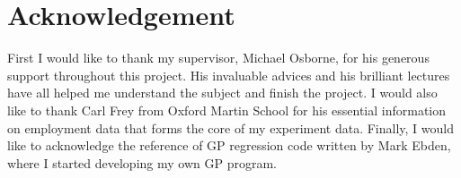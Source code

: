 \documentclass[11pt]{report}
\numberwithin{equation}{chapter}
\begin{document}
\newpage
\section*{Acknowledgement}
First I would like to thank my supervisor, Michael Osborne, for his generous support throughout this project. His invaluable advices and his brilliant lectures have all helped me understand the subject and finish the project. I would also like to thank Carl Frey from Oxford Martin School for his essential information on employment data that forms the core of my experiment data. Finally, I would like to acknowledge the reference of GP regression code written by Mark Ebden, where I started developing my own GP program. 

\newpage 
{}
\lhead{} 
 
\tableofcontents
\end{document}
